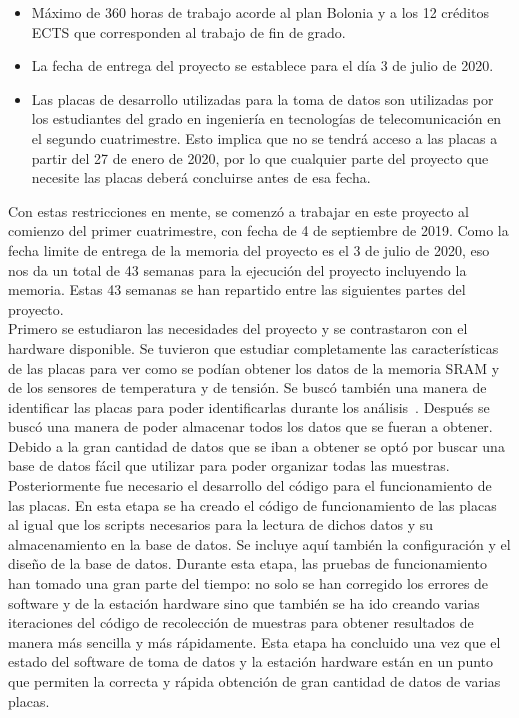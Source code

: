 \documentclass[spanish]{template/minim}
\begin{document}
\begin{itemize}
\item Máximo de 360 horas de trabajo acorde al plan Bolonia y a los 12 créditos ECTS que corresponden al trabajo de fin de grado.~
\item La fecha de entrega del proyecto se establece para el día 3 de julio de 2020.
\item Las placas de desarrollo utilizadas para la toma de datos son utilizadas por los estudiantes del grado en ingeniería en tecnologías de telecomunicación en el segundo cuatrimestre. Esto implica que no se tendrá acceso a las placas a partir del 27 de enero de 2020, por lo que cualquier parte del proyecto que necesite las placas deberá concluirse antes de esa fecha.
\end{itemize}

Con estas restricciones en mente, se comenzó a trabajar en este proyecto al comienzo del primer cuatrimestre, con fecha de 4 de septiembre de 2019. Como la fecha limite de entrega de la memoria del proyecto es el 3 de julio de 2020, eso nos da un total de 43 semanas para la ejecución del proyecto incluyendo la memoria. Estas 43 semanas se han repartido entre las siguientes partes del proyecto.\\

Primero se estudiaron las necesidades del proyecto y se contrastaron con el hardware disponible. Se tuvieron que estudiar completamente las características de las placas para ver como se podían obtener los datos de la memoria SRAM y de los sensores de temperatura y de tensión. Se buscó también una manera de identificar las placas para poder identificarlas durante los análisis~. Después se buscó una manera de poder almacenar todos los datos que se fueran a obtener. Debido a la gran cantidad de datos que se iban a obtener se optó por buscar una base de datos fácil que utilizar para poder organizar todas las muestras.\\

Posteriormente fue necesario el desarrollo del código para el funcionamiento de las placas. En esta etapa se ha creado el código de funcionamiento de las placas al igual que los scripts necesarios para la lectura de dichos datos y su almacenamiento en la base de datos. Se incluye aquí también la configuración y el diseño de la base de datos. Durante esta etapa, las pruebas de funcionamiento han tomado una gran parte del tiempo: no solo se han corregido los errores de software y de la estación hardware sino que también se ha ido creando varias iteraciones del código de recolección de muestras para obtener resultados de manera más sencilla y más rápidamente. Esta etapa ha concluido una vez que el estado del software de toma de datos y la estación hardware están en un punto que permiten la correcta y rápida obtención de gran cantidad de datos de varias placas.\\
\end{document}
